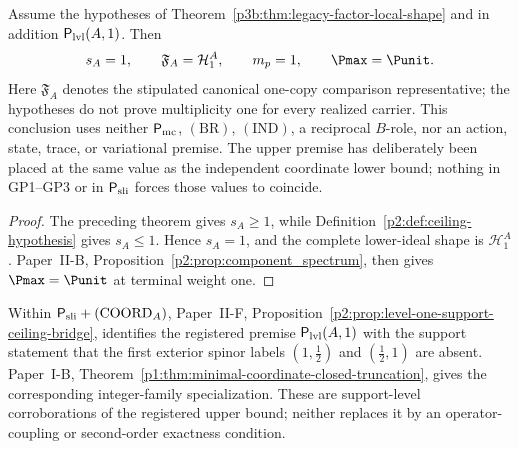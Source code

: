 \documentclass[11pt,a4paper]{article}
\begin{document}
\begin{theorem}
\label{p3b:thm:legacy-factor-local-m1}
Assume the hypotheses of
Theorem~\ref{p3b:thm:legacy-factor-local-shape} and in addition
\(\mathsf P_{\rm lvl}(A,1)\).  Then
\[
 s_A=1,
 \qquad
 \mathfrak F_A=\mathcal H_1^A,
 \qquad
 m_p=1,
 \qquad
 \Pmax=\Punit.
\]
Here $\mathfrak F_A$ denotes the stipulated canonical one-copy comparison representative; the hypotheses do not prove multiplicity one for every realized carrier. This conclusion uses neither \(\mathsf P_{\rm mc}\), \((\mathrm{BR})\),
\((\mathrm{IND})\), a reciprocal \(B\)-role, nor an action, state, trace, or
variational premise.  The upper premise has deliberately been placed at the
same value as the independent coordinate lower bound; nothing in GP1--GP3 or
in \(\mathsf P_{\rm sli}\) forces those values to coincide.
\end{theorem}

\begin{proof}
The preceding theorem gives \(s_A\ge1\), while
Definition~\ref{p2:def:ceiling-hypothesis} gives \(s_A\le1\).  Hence
\(s_A=1\), and the complete lower-ideal shape is \(\mathcal H_1^A\).  Paper~II-B,
Proposition~\ref{p2:prop:component_spectrum}, then gives
\(\Pmax=\Punit\) at terminal weight one.
\end{proof}

\begin{remark}
\label{p3:rem:registered-ceiling-support-provenance}
Within \(\mathsf P_{\rm sli}+(\mathrm{COORD}_A)\), Paper~II-F,
Proposition~\ref{p2:prop:level-one-support-ceiling-bridge}, identifies the
registered premise \(\mathsf P_{\rm lvl}(A,1)\) with the support statement
that the first exterior spinor labels
\((1,\tfrac12)\) and \((\tfrac12,1)\) are absent.  Paper~I-B,
Theorem~\ref{p1:thm:minimal-coordinate-closed-truncation}, gives the
corresponding integer-family specialization.  These are support-level
corroborations of the registered upper bound; neither replaces it by an
operator-coupling or second-order exactness condition.
\end{remark}
\end{document}
